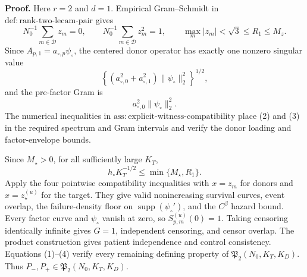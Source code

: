 \textbf{Proof.}
Here \(r=2\) and \(d=1\).  Empirical Gram--Schmidt in
\(\mathrm{def:rank\mbox{-}two\mbox{-}lecam\mbox{-}pair}\) gives
\[
 N_0^{-1}\sum_{m\in\mathcal D}z_m=0,
 \qquad
 N_0^{-1}\sum_{m\in\mathcal D}z_m^2=1,
 \qquad
 \max_m|z_m|<\sqrt3\le R_1\le M_z.                         \tag{1}
\]
Since \(A_{p,1}=a_{\circ,p}\psi_\circ\), the centered donor operator has
exactly one nonzero singular value
\[
 \left\{(a_{\circ,0}^2+a_{\circ,1}^2)
              \|\psi_\circ\|_2^2\right\}^{1/2},             \tag{2}
\]
and the pre-factor Gram is
\[
 a_{\circ,0}^2\|\psi_\circ\|_2^2.                          \tag{3}
\]
The numerical inequalities in
\(\mathrm{ass:explicit\mbox{-}witness\mbox{-}compatibility}\) place (2)
and (3) in the required spectrum and Gram intervals and verify the donor
loading and factor-envelope bounds.

Since \(M_\star>0\), for all sufficiently large \(K_T\),
\[
 h_\circ K_T^{-1/2}\le\min\{M_\star,R_1\}.                  \tag{4}
\]
Apply the four pointwise compatibility inequalities with \(x=z_m\) for
donors and \(x=z_\star^{(u)}\) for the target.  They give valid
nonincreasing survival curves, event overlap, the failure-density floor on
\(\operatorname{supp}(\psi_\circ')\), and the \(C^\beta\) hazard bound.
Every factor curve and \(\psi_\circ\) vanish at zero, so
\(S_{p,m}^{(u)}(0)=1\).  Taking censoring identically infinite gives
\(G=1\), independent censoring, and censor overlap.  The product construction
gives patient independence and control consistency.  Equations (1)--(4)
verify every remaining defining property of
\(\mathfrak P_2(N_0,K_T,K_D)\).  Thus
\(P_-,P_+\in\mathfrak P_2(N_0,K_T,K_D)\).

